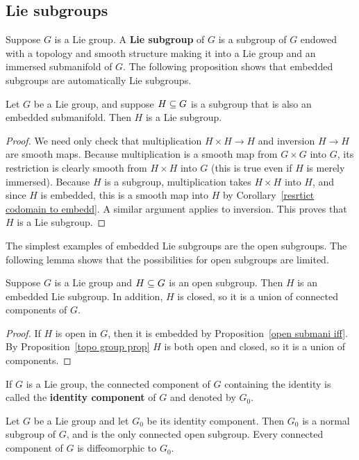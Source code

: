 \subsection{Lie subgroups}
Suppose $G$ is a Lie group. A \textbf{Lie subgroup} of $G$ is a subgroup of $G$ endowed with a topology and smooth structure making it into a Lie group and an immersed submanifold of $G$. The following proposition shows that embedded subgroups are automatically Lie subgroups.
\begin{proposition}\label{Lie subgroup embedd mani}
Let $G$ be a Lie group, and suppose $H\subseteq G$ is a subgroup that is also an embedded submanifold. Then $H$ is a Lie subgroup.
\end{proposition}
\begin{proof}
We need only check that multiplication $H\times H\to H$ and inversion $H\to H$ are smooth maps. Because multiplication is a smooth map from $G\times G$ into $G$, its
restriction is clearly smooth from $H\times H$ into $G$ (this is true even if $H$ is merely immersed). Because $H$ is a subgroup, multiplication takes $H\times H$ into $H$, and since $H$ is embedded, this is a smooth map into $H$ by Corollary~\ref{resrtict codomain to embedd}. A similar argument applies to inversion. This proves that $H$ is a Lie subgroup.
\end{proof}
The simplest examples of embedded Lie subgroups are the open subgroups. The
following lemma shows that the possibilities for open subgroups are limited.
\begin{lemma}\label{Lie subgroup open}
Suppose $G$ is a Lie group and $H\subseteq G$ is an open subgroup. Then $H$ is an embedded Lie subgroup. In addition, $H$ is closed, so it is a union of connected components of $G$.
\end{lemma}
\begin{proof}
If $H$ is open in $G$, then it is embedded by Proposition~\ref{open submani iff}. By Proposition~\ref{topo group prop} $H$ is both open and closed, so it is a union of components.
\end{proof}
If $G$ is a Lie group, the connected component of $G$ containing the identity is called the \textbf{identity component} of $G$ and denoted by $G_0$.
\begin{proposition}\label{Lie identity component}
Let $G$ be a Lie group and let $G_0$ be its identity component. Then $G_0$ is a normal subgroup of $G$, and is the only connected open subgroup. Every
connected component of $G$ is diffeomorphic to $G_0$.
\end{proposition}
